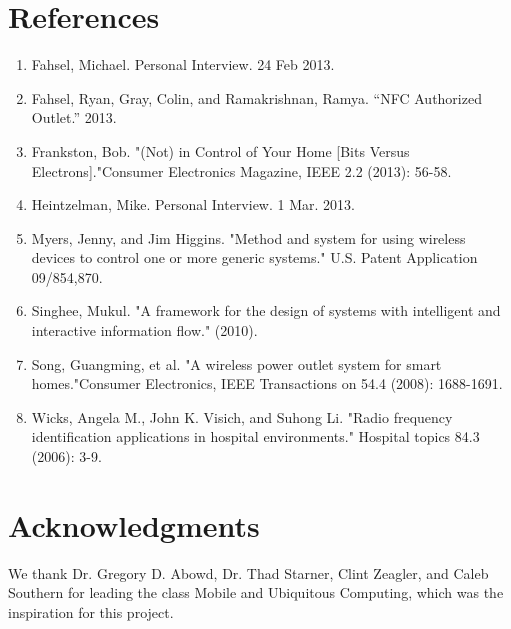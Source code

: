 \documentclass{sigchi}
\begin{document}
\section{References}
\begin{enumerate}
\item Fahsel, Michael. Personal Interview. 24 Feb 2013.

\item Fahsel, Ryan, Gray, Colin, and Ramakrishnan, Ramya. “NFC Authorized Outlet.” 2013.

\item Frankston, Bob. "(Not) in Control of Your Home [Bits Versus Electrons]."Consumer Electronics Magazine, IEEE 2.2 (2013): 56-58.

\item Heintzelman, Mike. Personal Interview. 1 Mar. 2013.

\item Myers, Jenny, and Jim Higgins. "Method and system for using wireless devices to control one or more generic systems." U.S. Patent Application 09/854,870.

\item Singhee, Mukul. "A framework for the design of systems with intelligent and interactive information flow." (2010).

\item Song, Guangming, et al. "A wireless power outlet system for smart homes."Consumer Electronics, IEEE Transactions on 54.4 (2008): 1688-1691.

\item Wicks, Angela M., John K. Visich, and Suhong Li. "Radio frequency identification applications in hospital environments." Hospital topics 84.3 (2006): 3-9.
\end{enumerate}

\section{Acknowledgments}

We thank Dr. Gregory D. Abowd, Dr. Thad Starner, Clint Zeagler, and Caleb Southern for leading the class Mobile and Ubiquitous Computing, which was the inspiration for this project.

%
%
%
%
%
\pagebreak
\newpage
\end{document}

